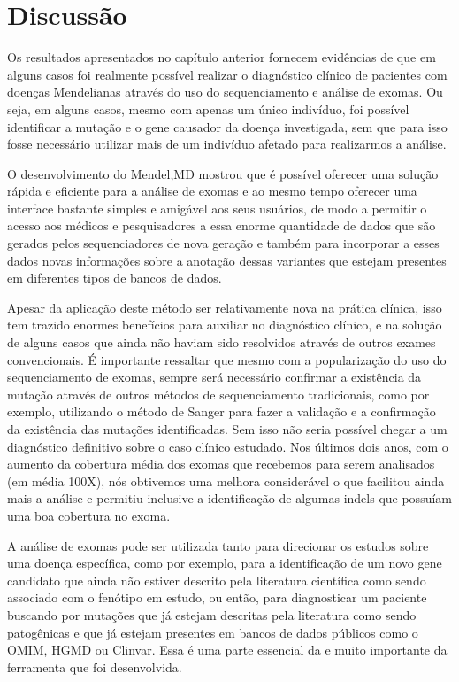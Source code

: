 \chapter{Discussão}

Os resultados apresentados no capítulo anterior fornecem evidências de que em alguns casos foi realmente possível realizar o diagnóstico clínico de pacientes com doenças Mendelianas através do uso do sequenciamento e análise de exomas. Ou seja, em alguns casos, mesmo com apenas um único indivíduo, foi possível identificar a mutação e o gene causador da doença investigada, sem que para isso fosse necessário utilizar mais de um indivíduo afetado para realizarmos a análise.

O desenvolvimento do Mendel,MD mostrou que é possível oferecer uma solução rápida e eficiente para a análise de exomas e ao mesmo tempo oferecer uma interface bastante simples e amigável aos seus usuários, de modo a permitir o acesso aos médicos e pesquisadores a essa enorme quantidade de dados que são gerados pelos sequenciadores de nova geração e também para incorporar a esses dados novas informações sobre a anotação dessas variantes que estejam presentes em diferentes tipos de bancos de dados.

Apesar da aplicação deste método ser relativamente nova na prática clínica, isso tem trazido enormes benefícios para auxiliar no diagnóstico clínico, e na solução de alguns casos que ainda não haviam sido resolvidos através de outros exames convencionais. É importante ressaltar que mesmo com a popularização do uso do sequenciamento de exomas, sempre será necessário confirmar a existência da mutação através de outros métodos de sequenciamento tradicionais, como por exemplo, utilizando o método de Sanger para fazer a validação e a confirmação da existência das mutações identificadas. Sem isso não seria possível chegar a um diagnóstico definitivo sobre o caso clínico estudado. Nos últimos dois anos, com o aumento da cobertura média dos exomas que recebemos para serem analisados (em média 100X), nós obtivemos uma melhora considerável o que facilitou ainda mais a análise e permitiu inclusive a identificação de algumas indels que possuíam uma boa cobertura no exoma.

A análise de exomas pode ser utilizada tanto para direcionar os estudos sobre uma doença específica, como por exemplo, para a identificação de um novo gene candidato que ainda não estiver descrito pela literatura científica como sendo associado com o fenótipo em estudo, ou então, para diagnosticar um paciente buscando por mutações que já estejam descritas pela literatura como sendo patogênicas e que já estejam presentes em bancos de dados públicos como o OMIM, HGMD ou Clinvar. Essa é uma parte essencial da e muito importante da ferramenta que foi desenvolvida.

